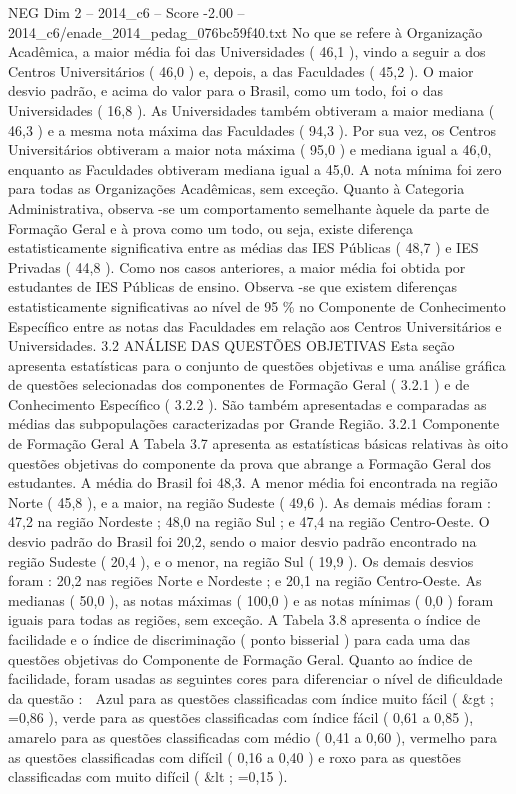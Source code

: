\begin{textsample}{NEG Dim 2 – 2014\_c6 – Score -2.00 – 2014\_c6/enade\_2014\_pedag\_076bc59f40.txt}
No que se refere à Organização Acadêmica, a maior média foi das Universidades ( 46,1 ), vindo a seguir a dos Centros Universitários ( 46,0 ) e, depois, a das Faculdades ( 45,2 ).
O maior desvio padrão, e acima do valor para o Brasil, como um todo, foi o das Universidades ( 16,8 ).
As Universidades também obtiveram a maior mediana ( 46,3 ) e a mesma nota máxima das Faculdades ( 94,3 ).
Por sua vez, os Centros Universitários obtiveram a maior nota máxima ( 95,0 ) e mediana igual a 46,0, enquanto as Faculdades obtiveram mediana igual a 45,0.
A nota mínima foi zero para todas as Organizações Acadêmicas, sem exceção.
Quanto à Categoria Administrativa, observa -se um comportamento semelhante àquele da parte de Formação Geral e à prova como um todo, ou seja, existe diferença estatisticamente significativa entre as médias das IES Públicas ( 48,7 ) e IES Privadas ( 44,8 ).
Como nos casos anteriores, a maior média foi obtida por estudantes de IES Públicas de ensino.
Observa -se que existem diferenças estatisticamente significativas ao nível de 95 \% no Componente de Conhecimento Específico entre as notas das Faculdades em relação aos Centros Universitários e Universidades. 3.2 ANÁLISE DAS QUESTÕES OBJETIVAS Esta seção apresenta estatísticas para o conjunto de questões objetivas e uma análise gráfica de questões selecionadas dos componentes de Formação Geral ( 3.2.1 ) e de Conhecimento Específico ( 3.2.2 ).
São também apresentadas e comparadas as médias das subpopulações caracterizadas por Grande Região. 3.2.1 Componente de Formação Geral A Tabela 3.7 apresenta as estatísticas básicas relativas às oito questões objetivas do componente da prova que abrange a Formação Geral dos estudantes.
A média do Brasil foi 48,3.
A menor média foi encontrada na região Norte ( 45,8 ), e a maior, na região Sudeste ( 49,6 ).
As demais médias foram : 47,2 na região Nordeste ; 48,0 na região Sul ; e 47,4 na região Centro-Oeste.
O desvio padrão do Brasil foi 20,2, sendo o maior desvio padrão encontrado na região Sudeste ( 20,4 ), e o menor, na região Sul ( 19,9 ).
Os demais desvios foram : 20,2 nas regiões Norte e Nordeste ; e 20,1 na região Centro-Oeste.
As medianas ( 50,0 ), as notas máximas ( 100,0 ) e as notas mínimas ( 0,0 ) foram iguais para todas as regiões, sem exceção.
A Tabela 3.8 apresenta o índice de facilidade e o índice de discriminação ( ponto bisserial ) para cada uma das questões objetivas do Componente de Formação Geral.
Quanto ao índice de facilidade, foram usadas as seguintes cores para diferenciar o nível de dificuldade da questão :  Azul para as questões classificadas com índice muito fácil ( \&gt ; =0,86 ), verde para as questões classificadas com índice fácil ( 0,61 a 0,85 ), amarelo para as questões classificadas com médio ( 0,41 a 0,60 ), vermelho para as questões classificadas com difícil ( 0,16 a 0,40 ) e roxo para as questões classificadas com muito difícil ( \&lt ; =0,15 ).

\end{textsample}
